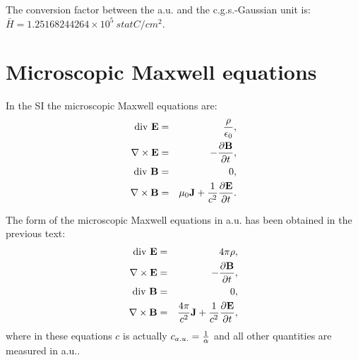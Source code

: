 \documentclass[12pt,a4paper]{article}
\def\htoh{7.95774715242\times 10^{1}}
\def\barhcgs{1.25168244264\times 10^{5}}
\begin{document}


{\color{green} The conversion factor between the a.u. and the c.g.s.-Gaussian 
unit is:
$\bar H = \barhcgs\ statC/cm^2$.
}

\newpage
\section{\color{coral}Microscopic Maxwell equations}
In the SI the microscopic Maxwell equations are:
\begin{eqnarray}
{\rm div}\ {\bf E} &=& {\rho\over {\epsilon_0}}, \\
\nabla \times {\bf E} &=& -{\partial {\bf B} \over \partial t}, \\
{\rm div}\  {\bf B} &=& 0, \\
\nabla \times {\bf B} &=& \mu_0{\bf J}+ {1\over c^2}
{\partial {\bf E} \over \partial t}. 
\end{eqnarray}

{\color{web-blue} The form of the microscopic Maxwell equations
in a.u. has been obtained in the previous text:
\begin{eqnarray}
{\rm div}\ {\bf E} &=& 4 \pi \rho, \\
\nabla \times {\bf E} &=& -{\partial {\bf B} \over \partial t}, \\
{\rm div}\  {\bf B} &=& 0, \\
\nabla \times {\bf B} &=& {4 \pi \over c^2} {\bf J}+ {1\over c^2}
{\partial {\bf E} \over \partial t}, 
\end{eqnarray}
where in these equations $c$ is actually $c_{a.u.}={1\over \alpha}$ and all 
other quantities are measured in a.u..
}
\\
\end{document}
